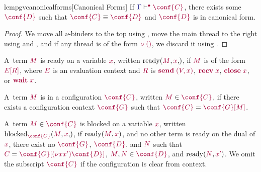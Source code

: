 \documentclass[main.tex]{subfiles}
\begin{document}
\begin{restatablelemma}{lempgvcanonicalforms}[Canonical Forms]
  \label{lem:pgv-canonical-forms}
  If $\cseq[\main]{\ty{\Gamma}}{\conf{C}}$, there exists some $\tm{\conf{D}}$ such that $\tm{\conf{C}}\equiv\tm{\conf{D}}$ and $\tm{\conf{D}}$ is in canonical form.
\end{restatablelemma}
\begin{proof}
  We move all $\nu$-binders to the top using , move the main thread to the right using  and , and if any thread is of the form $\tm{\child\;\unit}$, we discard it using .
\end{proof}

\begin{definition}
  A~term $\tm{M}$ is ready on a variable $\tm{x}$, written $\ready\pair{\tm{M},\tm{x}}$, if $\tm{M}$ is of the form $\tm{\plug{E}{R}}$, where $\tm{E}$ is an evaluation context and $\tm{R}$ is $\tm{\send\;\pair{V}{x}}$, $\tm{\recv\;x}$, $\tm{\close\;x}$, or $\tm{\wait\;x}$.
\end{definition}


\begin{definition}
  A~term $\tm{M}$ is in a configuration $\tm{\conf{C}}$, written $\tm{M}\in\tm{\conf{C}}$, if there exists a configuration context $\tm{\conf{G}}$ such that $\tm{\conf{C}}=\tm{\plug{\conf{G}}{M}}$.
\end{definition}

\begin{definition}
  A~term $\tm{M}\in\tm{\conf{C}}$ is blocked on a variable $\tm{x}$, written $\blocked_{\tm{\conf{C}}}\pair{\tm{M},\tm{x}}$, if $\ready\pair{\tm{M}}{\tm{x}}$, and no other term is ready on the dual of $\tm{x}$, \ie there exist no $\tm{\conf{G}}$, $\tm{\conf{D}}$, and $\tm{N}$ such that $\tm{C}=\tm{\plug{\conf{G}}{\res{x}{x'}{\conf{D}}}}$, $\tm{M},\tm{N}\in\tm{\conf{D}}$, and $\ready\pair{\tm{N}}{\tm{x'}}$. We omit the subscript $\tm{\conf{C}}$ if the configuration is clear from context.
\end{definition}
\end{document}
